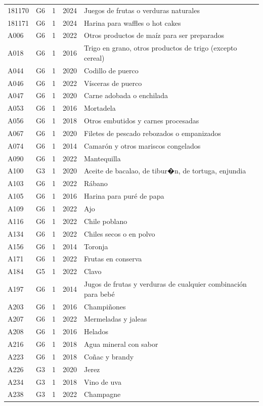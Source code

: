\begin{table}[ht]
\begin{tabular}{llrll}
  181170 & G6 &   1 & 2024 & Juegos de frutas o verduras naturales \\ 
  181171 & G6 &   1 & 2024 & Harina para waffles o hot cakes \\ 
  A006 & G6 &   1 & 2022 & Otros productos de maíz para ser preparados \\ 
  A018 & G6 &   1 & 2016 & Trigo en grano, otros productos de trigo (excepto cereal) \\ 
  A044 & G6 &   1 & 2020 & Codillo de puerco \\ 
  A046 & G6 &   1 & 2022 & Vísceras de puerco \\ 
  A047 & G6 &   1 & 2020 & Carne adobada o enchilada \\ 
  A053 & G6 &   1 & 2016 & Mortadela \\ 
  A056 & G6 &   1 & 2018 & Otros embutidos y carnes procesadas \\ 
  A067 & G6 &   1 & 2020 & Filetes de pescado rebozados o empanizados \\ 
  A074 & G6 &   1 & 2014 & Camarón y otros mariscos congelados \\ 
  A090 & G6 &   1 & 2022 & Mantequilla \\ 
  A100 & G3 &   1 & 2020 & Aceite de bacalao, de tibur�n, de tortuga, enjundia \\ 
  A103 & G6 &   1 & 2022 & Rábano \\ 
  A105 & G6 &   1 & 2016 & Harina para puré de papa \\ 
  A109 & G6 &   1 & 2022 & Ajo \\ 
  A116 & G6 &   1 & 2022 & Chile poblano \\ 
  A134 & G6 &   1 & 2022 & Chiles secos o en polvo \\ 
  A156 & G6 &   1 & 2014 & Toronja \\ 
  A171 & G6 &   1 & 2022 & Frutas en conserva \\ 
  A184 & G5 &   1 & 2022 & Clavo \\ 
  A197 & G6 &   1 & 2014 & Jugos de frutas y verduras de cualquier combinación para bebé \\ 
  A203 & G6 &   1 & 2016 & Champiñones \\ 
  A207 & G6 &   1 & 2022 & Mermeladas y jaleas \\ 
  A208 & G6 &   1 & 2016 & Helados \\ 
  A216 & G6 &   1 & 2018 & Agua mineral con sabor \\ 
  A223 & G6 &   1 & 2018 & Coñac y brandy \\ 
  A226 & G3 &   1 & 2020 & Jerez \\ 
  A234 & G3 &   1 & 2018 & Vino de uva \\ 
  A238 & G3 &   1 & 2022 & Champagne \\ 
   \bottomrule
\end{tabular}
\end{table}
